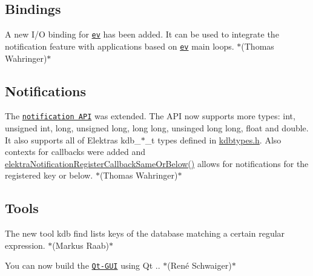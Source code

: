 \subsection*{Bindings}


\begin{DoxyItemize}
\item A new I/O binding for \href{https://www.libelektra.org/bindings/io_ev}{\tt ev} has been added. It can be used to integrate the notification feature with applications based on \href{http://libev.schmorp.de}{\tt ev} main loops. $\ast$(Thomas Wahringer)$\ast$
\end{DoxyItemize}

\subsection*{Notifications}


\begin{DoxyItemize}
\item The \href{https://doc.libelektra.org/api/current/html/group__kdbnotification.html}{\tt notification A\+PI} was extended. The A\+PI now supports more types\+: {\ttfamily int}, {\ttfamily unsigned int}, {\ttfamily long}, {\ttfamily unsigned long}, {\ttfamily long long}, {\ttfamily unsinged long long}, {\ttfamily float} and {\ttfamily double}. It also supports all of Elektra\textquotesingle{}s {\ttfamily kdb\+\_\+$\ast$\+\_\+t} types defined in {\ttfamily \hyperlink{kdbtypes_8h}{kdbtypes.\+h}}. Also contexts for callbacks were added and {\ttfamily \hyperlink{group__kdbnotification_ga374edd4f4fff527d6511ce4d0df62681}{elektra\+Notification\+Register\+Callback\+Same\+Or\+Below()}} allows for notifications for the registered key or below. $\ast$(Thomas Wahringer)$\ast$
\end{DoxyItemize}

\subsection*{Tools}


\begin{DoxyItemize}
\item The new tool {\ttfamily kdb find} lists keys of the database matching a certain regular expression. $\ast$(Markus Raab)$\ast$
\item You can now build the \href{https://www.libelektra.org/tools/qt-gui}{\tt Qt-\/\+G\+UI} using Qt {.}. $\ast$(René Schwaiger)$\ast$
\end{DoxyItemize}


